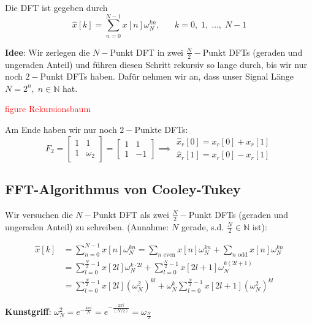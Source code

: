 \documentclass[11pt]{article}
\begin{document}
Die DFT ist gegeben durch 
$$\hat{x}[k] = \sum_{n=0}^{N-1} x[n]\omega_N^{kn}, \hspace{20pt} k=0, \; 1, \; \dots, \; N-1$$

\textbf{Idee}: Wir zerlegen die $N-$Punkt DFT in zwei $\frac{N}{2}-$Punkt DFTs (geraden und ungeraden Anteil) und führen diesen Schritt rekursiv so lange durch, bis wir nur noch $2-$Punkt DFTs haben. Dafür nehmen wir an, dass unser Signal Länge $N=2^n, \; n \in \mathbb{N}$ hat.

\textcolor{red}{figure Rekursionsbaum}

Am Ende haben wir nur noch $2-$Punkte DFTs:
$$F_2 = \begin{bmatrix}
    1 & 1 \\
    1 & \omega_2
\end{bmatrix} = \begin{bmatrix}
    1 & 1 \\
    1 & -1
\end{bmatrix} \implies \begin{array}{l}
    \hat{x}_r[0] = x_r[0] + x_r[1] \\
    \hat{x}_r[1] = x_r[0] - x_r[1]
\end{array}$$

\subsection*{FFT-Algorithmus von Cooley-Tukey}
\vspace*{-0.5cm}
Wir versuchen die $N-$Punkt DFT als zwei $\frac{N}{2}-$Punkt DFTs (geraden und ungeraden Anteil) zu schreiben. (Annahme: $N$ gerade, s.d. $\frac{N}{2} \in \mathbb{N}$ ist):

\begin{align*}
    \hat{x}[k] &= \sum_{n=0}^{N-1} x[n]\omega_N^{kn} = \sum_{n\text{ even}} x[n]\omega_N^{kn} + \sum_{n\text{ odd}} x[n]\omega_N^{kn} \\
    &= \sum_{l=0}^{\frac{N}{2}-1} x[2l]\omega_N^{k\cdot 2l} + \sum_{l=0}^{\frac{N}{2}-1} x[2l+1]\omega_N^{k(2l+1)} \\
    &= \sum_{l=0}^{\frac{N}{2}-1}x[2l]\left(\omega_N^2\right)^{kl} + \omega_N^k \sum_{l=0}^{\frac{N}{2}-1} x[2l+1] \left(\omega_N^2\right)^{kl}
\end{align*}

\textbf{Kunstgriff}: $\omega_N^2 = e^{-\frac{4 \pi i}{N}} = e^{-\frac{2 \pi i}{(N/2)}} = \omega_{\frac{N}{2}}$

\end{document}
